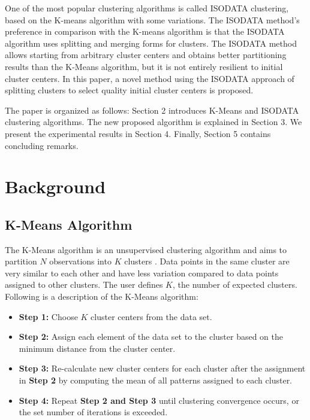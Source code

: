 \documentclass[a4paper, 10pt]{article}
\begin{document}
One of the most popular clustering algorithms is called ISODATA clustering,
based on the K-means algorithm with some variations. The ISODATA method's
preference in comparison with the K-means algorithm is that the ISODATA
algorithm uses splitting and merging forms for clusters. The ISODATA method
allows starting from arbitrary cluster centers and obtains better partitioning
results than the K-Means algorithm, but it is not entirely resilient to initial
cluster centers. In this paper, a novel method using the ISODATA approach of
splitting clusters to select quality initial cluster centers is proposed.

The paper is organized as follows: Section 2 introduces K-Means and ISODATA
clustering algorithms. The new proposed algorithm is explained in Section 3. We
present the experimental results in Section 4. Finally, Section 5 contains
concluding remarks.


\section{Background}

\subsection{K-Means Algorithm}

The K-Means algorithm is an unsupervised clustering algorithm and aims to
partition $N$ observations into $K$ clusters \cite{Lloyd1982,Macqueen1967}. Data
points in the same cluster are very similar to each other and have less
variation compared to data points assigned to other clusters. The user defines
$K$, the number of expected clusters. Following is a description of the K-Means
algorithm:

\begin{itemize}
      \item \textbf{Step 1:} Choose $K$ cluster centers from the data set.
      \item \textbf{Step 2:} Assign each element of the data set to the cluster
            based on the minimum distance from the cluster center.
      \item \textbf{Step 3:} Re-calculate new cluster centers for each cluster
            after the assignment in \textbf{Step 2} by computing the mean of all
            patterns assigned to each cluster.
      \item \textbf{Step 4:} Repeat \textbf{Step 2 and Step 3} until clustering
            convergence occurs, or the set number of iterations is exceeded.
\end{itemize}
\end{document}
